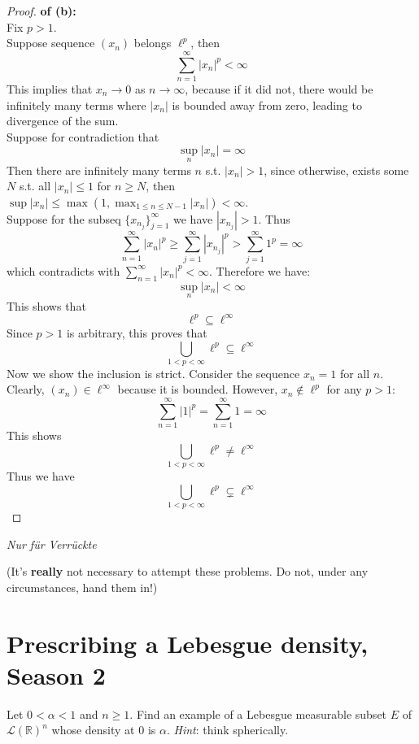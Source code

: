 \documentclass[lang=cn,11pt]{elegantbook}
\begin{document}
    
\begin{proof}
    \textbf{of (b):}\\
Fix $p>1$.\\
Suppose sequence \(( x_n) \) belongs \(\ell^p\), then \[
\sum_{n=1}^{\infty} |x_n|^p < \infty
\]
This implies that \( x_n \to 0 \) as \( n \to \infty \), because if it did not, there would be infinitely many terms where \( |x_n| \) is bounded away from zero, leading to divergence of the sum.\\
Suppose for contradiction that \[
\sup_{n} |x_n| = \infty
\]Then there are infinitely many terms $n$ s.t. $|x_n| > 1$, since otherwise, exists some $N$ s.t. all $|x_n| \leq 1$ for $n\geq N$, then $\sup |x_n|\leq \max(1, \max_{1\leq n \leq N-1} |x_n| )< \infty$.\\
Suppose for the subseq $\{x_{n_j}\}_{j=1}^\infty$ we have $|x_{n_j}| > 1$. Thus \[
\sum_{n=1}^{\infty} |x_n|^p  \geq \sum_{j=1}^{\infty} |x_{n_j}|^p > \sum_{j=1}^{\infty} 1^p = \infty
\]which contradicts with \(\sum_{n=1}^{\infty} |x_n|^p < \infty\). Therefore we have: \[
\sup_{n} |x_n| < \infty
\]
This shows that \[
\ell^p \subseteq \ell^\infty
\] Since $p>1$ is arbitrary, this proves that \[
\bigcup_{1<p<\infty} \ell^p \subseteq \ell^\infty
\]Now we show the inclusion is strict. Consider the sequence \( x_n = 1 \) for all \( n \). Clearly, \(( x_n)\in \ell^\infty \) because it is bounded. However, \( x_n \notin \ell^p \) for any \( p > 1 \):
\[
\sum_{n=1}^{\infty} |1|^p = \sum_{n=1}^{\infty} 1 = \infty
\]
This shows \[
\bigcup_{1<p<\infty} \ell^p \not =  \ell^\infty
\]Thus we have \[
\bigcup_{1<p<\infty} \ell^p \subsetneq \ell^\infty
\]
\end{proof}




\vspace*{10mm}

\begin{center}
  \textit{Nur f\"ur Verr\"uckte}
\end{center}
(It's \textbf{really} not necessary to attempt these problems. Do not, under any circumstances, hand them in!) 





\section{Prescribing a Lebesgue density, Season 2}
  Let $0<\alpha <1$ and $n\ge 1$. 
    Find an example of a Lebesgue measurable subset $E$ of $\mathcal{L}(\mathbb{R})^n$ whose density at $0$ is $\alpha$.
    \textit{Hint}: think spherically.
\end{document}
